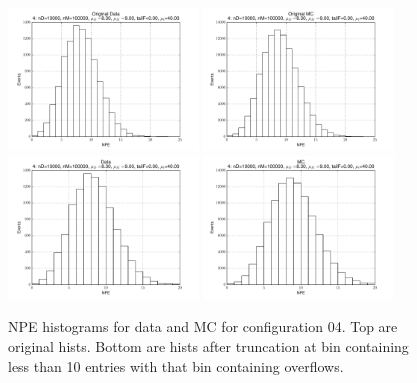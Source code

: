  \begin{figure}[htbp] \begin{center} 
\includegraphics[width=0.45\textwidth]{../FIGURES/04/FIG_Original_Data.pdf} 
\includegraphics[width=0.45\textwidth]{../FIGURES/04/FIG_Original_MC.pdf} 
\includegraphics[width=0.45\textwidth]{../FIGURES/04/FIG_Data.pdf} 
\includegraphics[width=0.45\textwidth]{../FIGURES/04/FIG_MC.pdf} 
\caption{NPE histograms for data and MC for configuration 04. Top are original hists. Bottom are hists after truncation at bin containing less than 10 entries with that bin containing overflows.} 
\label{tab:npe_04} 
\end{center} \end{figure} 

 